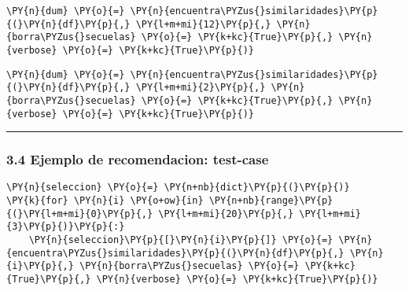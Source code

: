     \begin{tcolorbox}[breakable, size=fbox, boxrule=1pt, pad at break*=1mm,colback=cellbackground, colframe=cellborder]
\begin{Verbatim}[commandchars=\\\{\}]
\PY{n}{dum} \PY{o}{=} \PY{n}{encuentra\PYZus{}similaridades}\PY{p}{(}\PY{n}{df}\PY{p}{,} \PY{l+m+mi}{12}\PY{p}{,} \PY{n}{borra\PYZus{}secuelas} \PY{o}{=} \PY{k+kc}{True}\PY{p}{,} \PY{n}{verbose} \PY{o}{=} \PY{k+kc}{True}\PY{p}{)}
\end{Verbatim}
\end{tcolorbox}

    \begin{tcolorbox}[breakable, size=fbox, boxrule=1pt, pad at break*=1mm,colback=cellbackground, colframe=cellborder]
\begin{Verbatim}[commandchars=\\\{\}]
\PY{n}{dum} \PY{o}{=} \PY{n}{encuentra\PYZus{}similaridades}\PY{p}{(}\PY{n}{df}\PY{p}{,} \PY{l+m+mi}{2}\PY{p}{,} \PY{n}{borra\PYZus{}secuelas} \PY{o}{=} \PY{k+kc}{True}\PY{p}{,} \PY{n}{verbose} \PY{o}{=} \PY{k+kc}{True}\PY{p}{)}
\end{Verbatim}
\end{tcolorbox}

    \begin{center}\rule{0.5\linewidth}{0.5pt}\end{center}

\hypertarget{ejemplo-de-recomendacion-test-case}{%
\subsubsection{3.4 Ejemplo de recomendacion:
test-case}\label{ejemplo-de-recomendacion-test-case}}

    \begin{tcolorbox}[breakable, size=fbox, boxrule=1pt, pad at break*=1mm,colback=cellbackground, colframe=cellborder]
\begin{Verbatim}[commandchars=\\\{\}]
\PY{n}{seleccion} \PY{o}{=} \PY{n+nb}{dict}\PY{p}{(}\PY{p}{)}
\PY{k}{for} \PY{n}{i} \PY{o+ow}{in} \PY{n+nb}{range}\PY{p}{(}\PY{l+m+mi}{0}\PY{p}{,} \PY{l+m+mi}{20}\PY{p}{,} \PY{l+m+mi}{3}\PY{p}{)}\PY{p}{:}
    \PY{n}{seleccion}\PY{p}{[}\PY{n}{i}\PY{p}{]} \PY{o}{=} \PY{n}{encuentra\PYZus{}similaridades}\PY{p}{(}\PY{n}{df}\PY{p}{,} \PY{n}{i}\PY{p}{,} \PY{n}{borra\PYZus{}secuelas} \PY{o}{=} \PY{k+kc}{True}\PY{p}{,} \PY{n}{verbose} \PY{o}{=} \PY{k+kc}{True}\PY{p}{)}
\end{Verbatim}
\end{tcolorbox}
